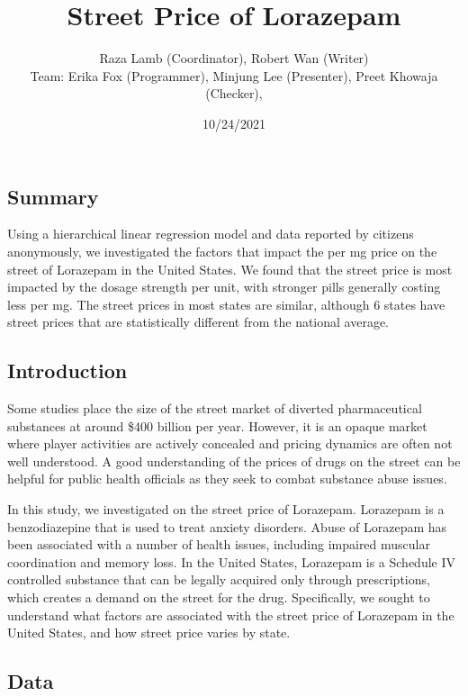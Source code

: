 \documentclass[
]{article}
\title{Street Price of Lorazepam}
\author{Raza Lamb (Coordinator), Robert Wan (Writer)\\
Team: Erika Fox (Programmer), Minjung Lee (Presenter), Preet Khowaja
(Checker),}
\date{10/24/2021}
\begin{document}
\maketitle

\hypertarget{summary}{%
\subsection{Summary}\label{summary}}

Using a hierarchical linear regression model and data reported by
citizens anonymously, we investigated the factors that impact the per mg
price on the street of Lorazepam in the United States. We found that the
street price is most impacted by the dosage strength per unit, with
stronger pills generally costing less per mg. The street prices in most
states are similar, although 6 states have street prices that are
statistically different from the national average.

\hypertarget{introduction}{%
\subsection{Introduction}\label{introduction}}

Some studies place the size of the street market of diverted
pharmaceutical substances at around \$400 billion per year. However, it
is an opaque market where player activities are actively concealed and
pricing dynamics are often not well understood. A good understanding of
the prices of drugs on the street can be helpful for public health
officials as they seek to combat substance abuse issues.

In this study, we investigated on the street price of Lorazepam.
Lorazepam is a benzodiazepine that is used to treat anxiety disorders.
Abuse of Lorazepam has been associated with a number of health issues,
including impaired muscular coordination and memory loss. In the United
States, Lorazepam is a Schedule IV controlled substance that can be
legally acquired only through prescriptions, which creates a demand on
the street for the drug. Specifically, we sought to understand what
factors are associated with the street price of Lorazepam in the United
States, and how street price varies by state.

\hypertarget{data}{%
\subsection{Data}\label{data}}
\end{document}
